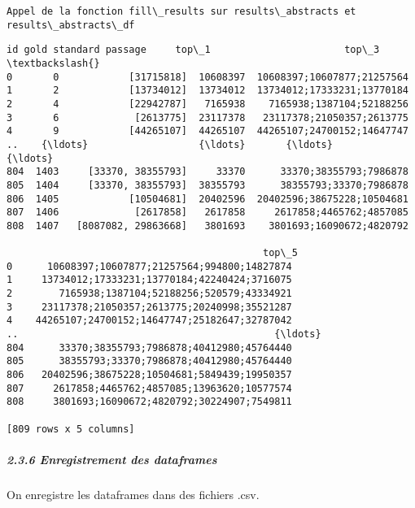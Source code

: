 \documentclass[11pt]{article}
\makeatletter
\newcommand{\boxspacing}{\kern\kvtcb@left@rule\kern\kvtcb@boxsep}
\newcommand{\prompt}[4]{
        {\ttfamily\llap{{\color{#2}[#3]:\hspace{3pt}#4}}\vspace{-\baselineskip}}
    }
\makeatother
\begin{document}
    \begin{Verbatim}[commandchars=\\\{\}]
Appel de la fonction fill\_results sur results\_abstracts et results\_abstracts\_df
    \end{Verbatim}

            \begin{tcolorbox}[breakable, size=fbox, boxrule=.5pt, pad at break*=1mm, opacityfill=0]
\prompt{Out}{outcolor}{47}{\boxspacing}
\begin{Verbatim}[commandchars=\\\{\}]
       id gold standard passage     top\_1                       top\_3  \textbackslash{}
0       0            [31715818]  10608397  10608397;10607877;21257564
1       2            [13734012]  13734012  13734012;17333231;13770184
2       4            [22942787]   7165938    7165938;1387104;52188256
3       6             [2613775]  23117378   23117378;21050357;2613775
4       9            [44265107]  44265107  44265107;24700152;14647747
..    {\ldots}                   {\ldots}       {\ldots}                         {\ldots}
804  1403     [33370, 38355793]     33370      33370;38355793;7986878
805  1404     [33370, 38355793]  38355793      38355793;33370;7986878
806  1405            [10504681]  20402596  20402596;38675228;10504681
807  1406             [2617858]   2617858     2617858;4465762;4857085
808  1407   [8087082, 29863668]   3801693    3801693;16090672;4820792

                                            top\_5
0      10608397;10607877;21257564;994800;14827874
1     13734012;17333231;13770184;42240424;3716075
2        7165938;1387104;52188256;520579;43334921
3     23117378;21050357;2613775;20240998;35521287
4    44265107;24700152;14647747;25182647;32787042
..                                            {\ldots}
804      33370;38355793;7986878;40412980;45764440
805      38355793;33370;7986878;40412980;45764440
806   20402596;38675228;10504681;5849439;19950357
807     2617858;4465762;4857085;13963620;10577574
808     3801693;16090672;4820792;30224907;7549811

[809 rows x 5 columns]
\end{Verbatim}
\end{tcolorbox}
        
    \subparagraph{2.3.6 Enregistrement des
dataframes}\label{enregistrement-des-dataframes}

On enregistre les dataframes dans des fichiers .csv.
\end{document}
